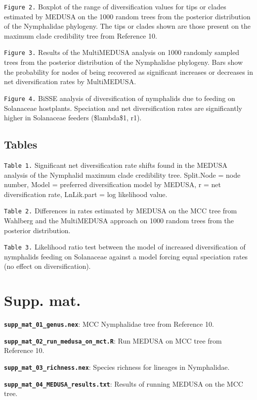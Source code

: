 \documentclass[10pt]{article}
\begin{document}
\texttt{Figure 2.} Boxplot of the range of diversification values for
tips or clades estimated by MEDUSA on the 1000 random trees from the
posterior distribution of the Nymphalidae phylogeny. The tips or clades
shown are those present on the maximum clade credibility tree from
Reference 10.

\texttt{Figure 3.} Results of the MultiMEDUSA analysis on 1000 randomly
sampled trees from the posterior distribution of the Nymphalidae
phylogeny. Bars show the probability for nodes of being recovered as
significant increases or decreases in net diversification rates by
MultiMEDUSA.

\texttt{Figure 4.} BiSSE analysis of diversification of nymphalids due
to feeding on Solanaceae hostplants. Speciation and net diversification
rates are significantly higher in Solanaceae feeders (\$lambda\$1, r1).

\subsection{Tables}\label{tables}

\texttt{Table 1.} Significant net diversification rate shifts found in
the MEDUSA analysis of the Nymphalid maximum clade credibility tree.
Split.Node = node number, Model = preferred diversification model by
MEDUSA, r = net diversification rate, LnLik.part = log likelihood value.

\texttt{Table 2.} Differences in rates estimated by MEDUSA on the MCC
tree from Wahlberg and the MultiMEDUSA approach on 1000 random trees
from the posterior distribution.

\texttt{Table 3.} Likelihood ratio test between the model of increased
diversification of nymphalids feeding on Solanaceae against a model
forcing equal speciation rates (no effect on diversification).

\section{Supp. mat.}\label{supp.-mat.}

\textbf{\texttt{supp\_mat\_01\_genus.nex}}: MCC Nymphalidae tree from
Reference 10.

\textbf{\texttt{supp\_mat\_02\_run\_medusa\_on\_mct.R}}: Run MEDUSA on
MCC tree from Reference 10.

\textbf{\texttt{supp\_mat\_03\_richness.nex}}: Species richness for
lineages in Nymphalidae.

\textbf{\texttt{supp\_mat\_04\_MEDUSA\_results.txt}}: Results of running
MEDUSA on the MCC tree.
\end{document}

